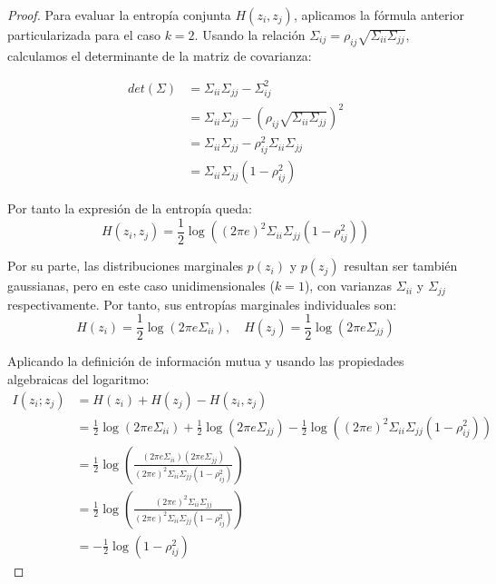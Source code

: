 \begin{proof}
Para evaluar la entropía conjunta $H(z_i, z_j)$, aplicamos la fórmula anterior particularizada para el caso $k=2$. Usando la relación $\Sigma_{ij} = \rho_{ij}\sqrt{\Sigma_{ii}\Sigma_{jj}}$, calculamos el determinante de la matriz de covarianza:

\begin{equation}
\begin{aligned} 
det(\Sigma) &= \Sigma_{ii}\Sigma_{jj} - \Sigma_{ij}^2 \\
            &= \Sigma_{ii}\Sigma_{jj} - \left( \rho_{ij}\sqrt{\Sigma_{ii}\Sigma_{jj}} \right)^2 \\
            &= \Sigma_{ii}\Sigma_{jj} - \rho_{ij}^2 \Sigma_{ii}\Sigma_{jj} \\ 
            &= \Sigma_{ii}\Sigma_{jj}(1 - \rho_{ij}^2)
\end{aligned}
\end{equation}

Por tanto la expresión de la entropía queda:
\begin{equation}
H(z_i, z_j) = \frac{1}{2} \log \left( (2\pi e)^2 \Sigma_{ii}\Sigma_{jj} (1 - \rho_{ij}^2) \right)
\end{equation}

Por su parte, las distribuciones marginales $p(z_i)$ y $p(z_j)$ resultan ser también gaussianas, pero en este caso unidimensionales ($k=1$), con varianzas $\Sigma_{ii}$ y $\Sigma_{jj}$ respectivamente. Por tanto, sus entropías marginales individuales son:
\begin{equation}
H(z_i) = \frac{1}{2} \log(2\pi e \Sigma_{ii}), \quad H(z_j) = \frac{1}{2} \log(2\pi e \Sigma_{jj})
\end{equation}

Aplicando la definición de información mutua y usando las propiedades algebraicas del logaritmo:
\begin{equation}
\begin{aligned}
I(z_i; z_j) &= H(z_i) + H(z_j) - H(z_i, z_j) \\
            &= \frac{1}{2} \log(2\pi e \Sigma_{ii}) + \frac{1}{2} \log(2\pi e \Sigma_{jj}) - \frac{1}{2} \log \left( (2\pi e)^2 \Sigma_{ii}\Sigma_{jj} (1 - \rho_{ij}^2) \right) \\
            &= \frac{1}{2} \log \left( \frac{(2\pi e \Sigma_{ii})(2\pi e \Sigma_{jj})}{(2\pi e)^2 \Sigma_{ii}\Sigma_{jj} (1 - \rho_{ij}^2)} \right) \\
            &= \frac{1}{2} \log \left( \frac{(2\pi e)^2 \Sigma_{ii}\Sigma_{jj}}{(2\pi e)^2 \Sigma_{ii}\Sigma_{jj} (1 - \rho_{ij}^2)} \right) \\
            &= -\frac{1}{2} \log(1 - \rho_{ij}^2)
\end{aligned}
\end{equation}
\end{proof}

